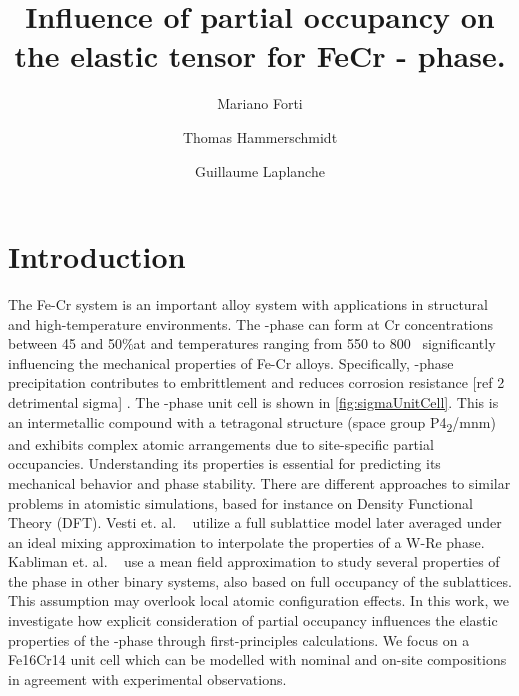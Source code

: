 \documentclass[superscriptaddress, 12pt]{revtex4-2}%
\date{}
\begin{document}
\title{Influence of partial occupancy on the elastic tensor for FeCr \textsigma - phase.}

\author{Mariano Forti} 

\author{Thomas Hammerschmidt} \email{}

\author{Guillaume Laplanche} \email{}


\maketitle

\section{Introduction}

The Fe-Cr system is an important alloy system with applications in structural and high-temperature environments. 
The \textsigma-phase can form at Cr concentrations between 45 and 50\%at and temperatures ranging from 550 to 800\textdegree ~\cite{laplanche_phase_2018} significantly influencing the mechanical properties of Fe-Cr alloys. 
Specifically, \textsigma-phase precipitation contributes to embrittlement and reduces corrosion resistance {\color{red}  [ref 2 detrimental sigma] }.
The \textsigma-phase unit cell is shown in \autoref{fig:sigmaUnitCell}. 
This is an intermetallic compound with a tetragonal structure (space group P4\textsubscript{2}/mnm) and exhibits complex atomic arrangements due to site-specific partial occupancies.  
Understanding its properties is essential for predicting its mechanical behavior and phase stability.  
There are different approaches to similar problems in atomistic simulations, based for instance on Density Functional Theory (DFT). 
Vesti et. al. ~\cite{vesti_ab-initio_2023} utilize a full sublattice model later averaged under an ideal mixing approximation to interpolate the properties of a W-Re \textsigma phase. 
Kabliman et. al. ~\cite{kabliman_ab_2012} use a mean field approximation to study several properties of the \textsigma phase in other binary systems, also based on full occupancy of the sublattices. 
This assumption may overlook local atomic configuration effects.  
In this work, we investigate how explicit consideration of partial occupancy influences the elastic properties of the \textsigma-phase through first-principles calculations. 
We focus on a Fe16Cr14 unit cell which can be modelled with nominal and on-site compositions in agreement with experimental observations.
\end{document}
